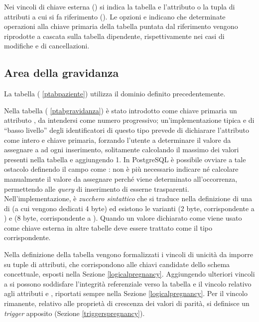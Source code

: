 Nei vincoli di chiave esterna () si indica la tabella e l'attributo o la tupla di attributi a cui si fa riferimento ().
Le opzioni  e  indicano che determinate operazioni alla chiave primaria della tabella puntata dal riferimento vengono riprodotte a cascata sulla tabella dipendente, rispettivamente nei casi di modifiche e di cancellazioni.

\subsection{Area della gravidanza}

La tabella  (\lstlistingname{} \ref{ptabpaziente}) utilizza il dominio  definito precedentemente.

Nella tabella  (\lstlistingname{} \ref{ptabgravidanza}) è stato introdotto come chiave primaria un attributo , da intendersi come numero progressivo; un'implementazione tipica e di \enquote{basso livello} degli identificatori di questo tipo prevede di dichiarare l'attributo come intero e chiave primaria, forzando l'utente a determinare il valore da assegnare a  ad ogni inserimento, solitamente calcolando il massimo dei valori  presenti nella tabella e aggiungendo 1.
In PostgreSQL \cite{Pos25} è possibile ovviare a tale ostacolo definendo il campo  come : non è più necessario indicare né calcolare manualmente il valore  da assegnare perché viene determinato all'occorrenza, permettendo alle \emph{query} di inserimento di esserne trasparenti.
Nell'implementazione,  è \emph{zucchero sintattico} che si traduce nella definizione di una  di  (a cui vengono dedicati 4 byte) ed esistono le varianti  (2 byte, corrispondente a ) e  (8 byte, corrispondente a ).
Quando un valore dichiarato come  viene usato come chiave esterna in altre tabelle deve essere trattato come il tipo  corrispondente.

Nella definizione della tabella  vengono formalizzati i vincoli di unicità da imporre su tuple di attributi, che corrispondono alle chiavi candidate dello schema concettuale, esposti nella Sezione \ref{logicalpregnancy}.
Aggiungendo ulteriori vincoli a  si possono soddisfare l'integrità referenziale verso la tabella  e il vincolo relativo agli attributi  e , riportati sempre nella Sezione \ref{logicalpregnancy}.
Per il vincolo rimanente, relativo alle proprietà di crescenza dei valori di parità, si definisce un \emph{trigger} apposito (Sezione \ref{triggerspregnancy}).

